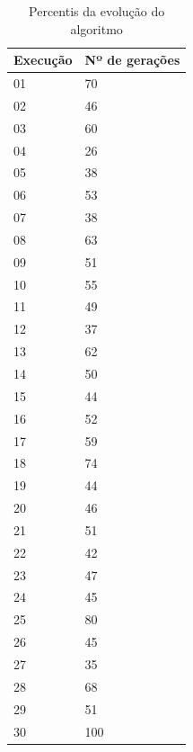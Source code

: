 \documentclass[11pt]{article}
\begin{document}
\begin{table}[H]
    \centering
    \caption{Percentis da evolução do algoritmo}
    \label{tbl:geracoes}
    \begin{tabular}{|l|l|}
    \hline
    Execução  & Nº de gerações\\ \hline
    01 & 70 \\ \hline
    02 & 46 \\ \hline
    03 & 60 \\ \hline
    04 & 26 \\ \hline
    05 & 38 \\ \hline
    06 & 53 \\ \hline
    07 & 38 \\ \hline
    08 & 63 \\ \hline
    09 & 51 \\ \hline
    10 & 55 \\ \hline
    11 & 49 \\ \hline
    12 & 37 \\ \hline
    13 & 62 \\ \hline
    14 & 50 \\ \hline
    15 & 44 \\ \hline
    16 & 52 \\ \hline
    17 & 59 \\ \hline
    18 & 74 \\ \hline
    19 & 44 \\ \hline
    20 & 46 \\ \hline
    21 & 51 \\ \hline
    22 & 42 \\ \hline
    23 & 47 \\ \hline
    24 & 45 \\ \hline
    25 & 80 \\ \hline
    26 & 45 \\ \hline
    27 & 35 \\ \hline
    28 & 68 \\ \hline
    29 & 51 \\ \hline
    30 & 100 \\ \hline
    \end{tabular}
\end{table}



\end{document}
